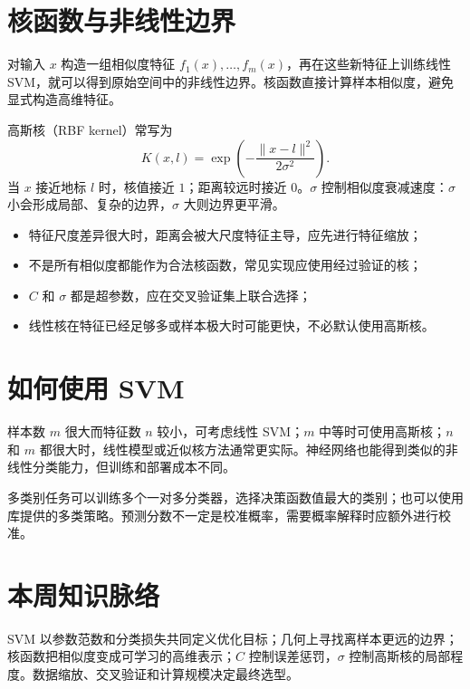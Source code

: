 \section{核函数与非线性边界}
\begin{definitionbox}[特征映射]
对输入 $x$ 构造一组相似度特征 $f_1(x),\ldots,f_m(x)$，再在这些新特征上训练线性 SVM，就可以得到原始空间中的非线性边界。核函数直接计算样本相似度，避免显式构造高维特征。
\end{definitionbox}
\begin{examplebox}[高斯核]
高斯核（RBF kernel）常写为
\[
K(x,l)=\exp\!\left(-\frac{\|x-l\|^2}{2\sigma^2}\right).
\]
当 $x$ 接近地标 $l$ 时，核值接近 $1$；距离较远时接近 $0$。$\sigma$ 控制相似度衰减速度：$\sigma$ 小会形成局部、复杂的边界，$\sigma$ 大则边界更平滑。
\end{examplebox}
\begin{mistakebox}[核函数使用条件]
\begin{itemize}
  \item 特征尺度差异很大时，距离会被大尺度特征主导，应先进行特征缩放；
  \item 不是所有相似度都能作为合法核函数，常见实现应使用经过验证的核；
  \item $C$ 和 $\sigma$ 都是超参数，应在交叉验证集上联合选择；
  \item 线性核在特征已经足够多或样本极大时可能更快，不必默认使用高斯核。
\end{itemize}
\end{mistakebox}

\section{如何使用 SVM}
\begin{keybox}[模型选择建议]
样本数 $m$ 很大而特征数 $n$ 较小，可考虑线性 SVM；$m$ 中等时可使用高斯核；$n$ 和 $m$ 都很大时，线性模型或近似核方法通常更实际。神经网络也能得到类似的非线性分类能力，但训练和部署成本不同。
\end{keybox}
\begin{tipbox}
多类别任务可以训练多个一对多分类器，选择决策函数值最大的类别；也可以使用库提供的多类策略。预测分数不一定是校准概率，需要概率解释时应额外进行校准。
\end{tipbox}
\section{本周知识脉络}
\begin{keybox}[大间隔与核技巧]
SVM 以参数范数和分类损失共同定义优化目标；几何上寻找离样本更远的边界；核函数把相似度变成可学习的高维表示；$C$ 控制误差惩罚，$\sigma$ 控制高斯核的局部程度。数据缩放、交叉验证和计算规模决定最终选型。
\end{keybox}

